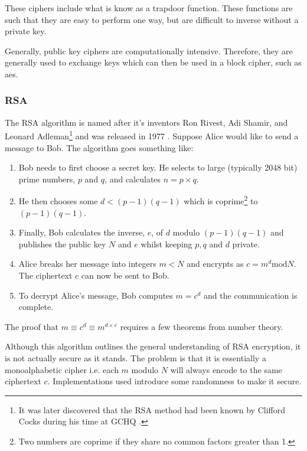 These ciphers include what is know as a {\color{bristol-red} trapdoor function}. These functions are such that they are easy to perform one way, but are difficult to inverse without a private key. 

Generally, public key ciphers are computationally intensive. Therefore, they are generally used to exchange keys which can then be used in a block cipher, such as \ac{aes}.

\subsubsection*{RSA}

The RSA algorithm is named after it's inventors Ron Rivest, Adi Shamir, and Leonard Adleman\footnote{It was later discovered that the RSA method had been known by Clifford Cocks during his time at GCHQ \cite{}.} and was released in 1977 \cite{}. Suppose Alice would like to send a message to Bob. The algorithm goes something like:

\begin{algorithm}[RSA]
\begin{enumerate}
	\item Bob needs to first choose a secret key. He selects to large (typically 2048 bit) prime numbers, $p$ and $q$, and calculates $n = p \times q$.
	\item He then chooses some $d < (p-1)(q-1)$ which is coprime\footnote{Two numbers are coprime if they share no common factors greater than 1.} to $(p-1)(q-1)$.
	\item Finally, Bob calculates the inverse, $e$, of $d$ modulo $(p-1)(q-1)$ and publishes the public key $N$ and $e$ whilst keeping $p,q$ and $d$ private.
	\item Alice breaks her message into integers $m < N$ and encrypts as $c = m^d \mathrm{ mod } N$. The ciphertext $c$ can now be sent to Bob.
	\item To decrypt Alice's message, Bob computes $m = c^d$ and the communication is complete. 
\end{enumerate}   
\end{algorithm}

The proof that $m \equiv c^d \equiv m^{d\times e}$ requires a few theorems from number theory. 

Although this algorithm outlines the general understanding of RSA encryption, it is not actually secure as it stands. The problem is that it is essentially a monoalphabetic cipher i.e. each $m$ modulo $N$ will always encode to the same ciphertext $c$. Implementations used introduce some randomness to make it secure.


